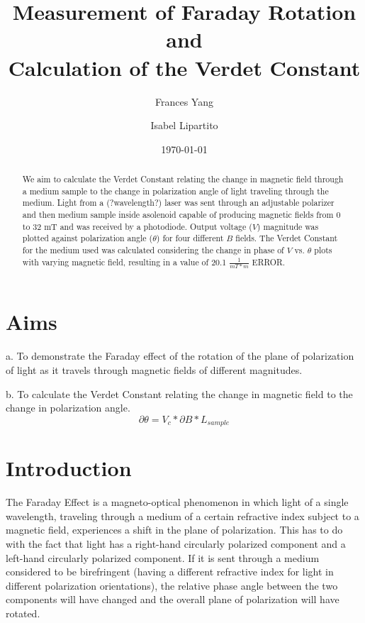\documentclass[prb,preprint]{revtex4-1}
\begin{document}
\title{Measurement of Faraday Rotation and \\ Calculation of the Verdet Constant }

\author{Frances Yang}

\author{Isabel Lipartito}

\date{\today}

\begin{abstract}
We aim to calculate the Verdet Constant relating the change in magnetic field through a medium sample to the change in polarization angle of light traveling through the medium.  Light from a (?wavelength?) laser was sent through an adjustable polarizer and then medium sample inside asolenoid capable of producing magnetic fields from 0 to 32 mT and was received by a photodiode.  Output voltage ($V$) magnitude was plotted against polarization angle ($\theta$) for four different $B$ fields.  The Verdet Constant for the medium used was calculated considering the change in phase of $V$ vs. $\theta$ plots with varying magnetic field, resulting in a value of 20.1 $\frac{1}{mT*m}$ ERROR.
\end{abstract}

\maketitle 
\section{Aims}
a.  To demonstrate the Faraday effect of the rotation of the plane of polarization of light as it travels through magnetic fields of different magnitudes.

b.  To calculate the Verdet Constant relating the change in magnetic field to the change in polarization angle.
\begin{equation}
\partial \theta =V_{c}*\partial B*L{_{sample}}
\end{equation}

\section{Introduction} 

{The Faraday Effect is a magneto-optical phenomenon in which light of a single wavelength, traveling through a medium of a certain refractive index subject to a magnetic field, experiences a shift in the plane of polarization.  This has to do with the fact that light has a right-hand circularly polarized component and a left-hand circularly polarized component.  If it is sent through a medium considered to be birefringent (having a different refractive index for light in different polarization orientations), the relative phase angle between the two components will have changed and the overall plane of polarization will have rotated.}
\end{document}
